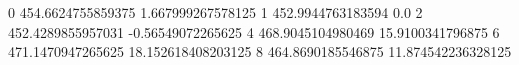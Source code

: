 0 454.6624755859375 1.667999267578125
1 452.9944763183594 0.0
2 452.4289855957031 -0.56549072265625
4 468.9045104980469 15.9100341796875
6 471.1470947265625 18.152618408203125
8 464.8690185546875 11.874542236328125
